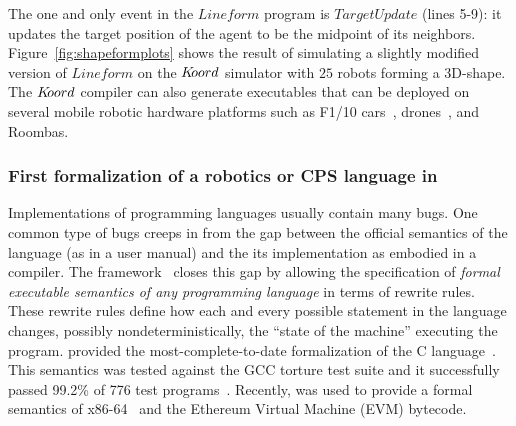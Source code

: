 %
The one and only event in the $\mathit{Lineform}$ program is $\mathit{TargetUpdate}$ (lines 5-9): it updates the target position of the agent  to be the midpoint of its neighbors.  Figure~\ref{fig:shapeformplots} shows the result of simulating a slightly modified version of $\mathit{Lineform}$ on the $K\kern-2pt oord$ simulator with $25$ robots forming a 3D-shape. The $K\kern-2pt oord$ compiler can also generate executables that can be deployed on several mobile robotic hardware platforms such as F1/10 cars~\cite{f1-10}, drones~\cite{}, and Roombas. 
 

%


\subsubsection{First formalization of a robotics or CPS language in \K}
Implementations of programming languages usually contain many bugs. One common type of bugs creeps in from the gap between the official semantics of the language (as in a user manual) and the its implementation as embodied in a compiler. The \K framework~\cite{Kf} closes this gap by allowing the specification of {\em  formal executable semantics of any programming language} in terms of rewrite rules. These rewrite rules define how each and every possible statement in the  language changes, possibly nondeterministically, the ``state of the machine'' executing the program. 
%
\K  provided the most-complete-to-date formalization  of the C language~\cite{KC}. This semantics was tested against the GCC torture test suite and it successfully passed 99.2\% of 776 test programs~\cite{chuckythesis}. Recently, \K  was used to provide a formal semantics of x86-64~\cite{rusuadvepaper} and the Ethereum Virtual Machine (EVM) bytecode. 


